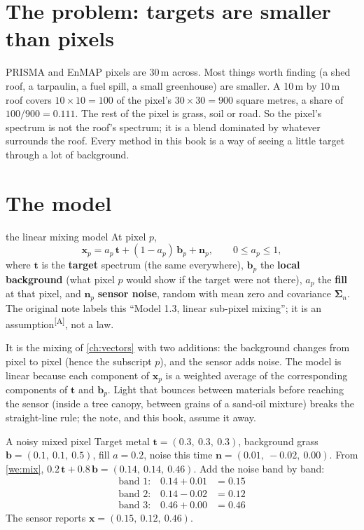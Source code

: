 \documentclass[11pt,a4paper,oneside,openany]{book}
\newcommand{\B}[1]{{\symbf{#1}}}
\newcommand{\B}[1]{{\bm{#1}}}
\newcommand{\assm}{\textsuperscript{\textsf{\scriptsize[A]}}}
\newcommand{\vx}{\B{x}}
\newcommand{\vt}{\B{t}}
\newcommand{\vb}{\B{b}}
\newcommand{\vn}{\B{n}}
\newcommand{\mSig}{\B{\Sigma}}
\begin{document}
\section{The problem: targets are smaller than pixels}

PRISMA and EnMAP pixels are 30\,m across. Most things worth finding (a shed roof, a tarpaulin, a fuel spill, a small greenhouse)
are smaller. A 10\,m by 10\,m roof covers $10\times10=100$ of the pixel's $30\times30=900$ square metres, a share of
$100/900=0.111$. The rest of the pixel is grass, soil or road. So the pixel's spectrum is not the roof's spectrum; it is a blend
dominated by whatever surrounds the roof. Every method in this book is a way of seeing a little target through a lot of
background.

\section{The model}

\begin{defn}{the linear mixing model}
At pixel $p$,
\[
  \vx_p=a_p\,\vt+(1-a_p)\,\vb_p+\vn_p,\qquad 0\le a_p\le1,
\]
where $\vt$ is the \textbf{target} spectrum (the same everywhere), $\vb_p$ the \textbf{local background} (what pixel $p$ would show
if the target were not there), $a_p$ the \textbf{fill} at that pixel, and $\vn_p$ \textbf{sensor noise}, random with mean zero and
covariance $\mSig_n$. The original note labels this ``Model 1.3, linear sub-pixel mixing''; it is an assumption\assm, not a law.
\end{defn}

It is the mixing of \cref{ch:vectors} with two additions: the background changes from pixel to pixel (hence the subscript
$p$), and the sensor adds noise. The model is linear because each component of $\vx_p$ is a weighted average of the
corresponding components of $\vt$ and $\vb_p$. Light that bounces between materials before reaching the sensor (inside a tree
canopy, between grains of a sand-oil mixture) breaks the straight-line rule; the note, and this book, assume it away.

\begin{worked}[label=we:mixnoise]{A noisy mixed pixel}
Target metal $\vt=(0.3,\ 0.3,\ 0.3)$, background grass $\vb=(0.1,\ 0.1,\ 0.5)$, fill $a=0.2$, noise this time
$\vn=(0.01,\ -0.02,\ 0.00)$. From \cref{we:mix}, $0.2\,\vt+0.8\,\vb=(0.14,\ 0.14,\ 0.46)$. Add the noise band by band:
\begin{align*}
\text{band 1:}\quad 0.14+0.01 &= 0.15\\
\text{band 2:}\quad 0.14-0.02 &= 0.12\\
\text{band 3:}\quad 0.46+0.00 &= 0.46
\end{align*}
The sensor reports $\vx=(0.15,\ 0.12,\ 0.46)$.
\end{worked}
\end{document}
